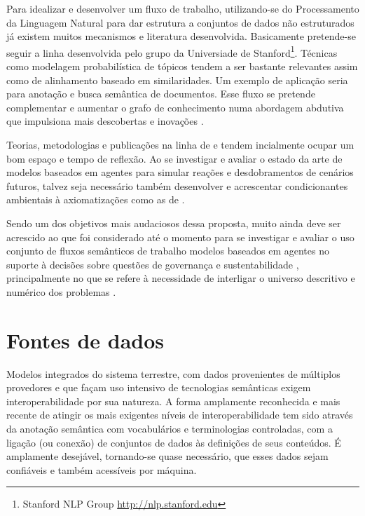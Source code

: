 \documentclass[
	11pt,				%
	openany,			%
	oneside,			%
	a4paper,			%
	english,			%
	french,				%
	spanish,			%
	brazil,				%
	]{abntex2}
\begin{document}
Para idealizar e desenvolver um fluxo de trabalho, utilizando-se do Processamento da Linguagem Natural para dar estrutura a conjuntos de dados não estruturados já existem muitos mecanismos e literatura desenvolvida. Basicamente pretende-se seguir a linha desenvolvida pelo grupo da Universiade de Stanford\footnote{Stanford NLP Group \url{http://nlp.stanford.edu}}. Técnicas como modelagem probabilística de tópicos \cite{blei_probabilistic_2012} tendem a ser bastante relevantes assim como de alinhamento baseado em similaridades. Um exemplo de aplicação seria para anotação e busca semântica de documentos. Esse fluxo se pretende complementar e aumentar o grafo de conhecimento numa abordagem abdutiva que impulsiona mais descobertas e inovações \cite{gil_data_2009}.

Teorias, metodologias e publicações na linha de  e  tendem incialmente ocupar um bom espaço e tempo de reflexão. Ao se investigar e avaliar o estado da arte de modelos baseados em agentes para simular reações e desdobramentos de cenários futuros, talvez seja necessário também desenvolver e acrescentar condicionantes ambientais à axiomatizações como as de .

Sendo um dos objetivos mais audaciosos dessa proposta, muito ainda deve ser acrescido ao que foi considerado até o momento para se investigar e avaliar o uso conjunto de fluxos semânticos de trabalho \cite{mattoso_addressing_2016} modelos baseados em agentes no suporte à decisões sobre questões de governança e sustentabilidade \cite{buckingham_shum_towards_2012}, principalmente no que se refere à necessidade de interligar o universo descritivo e numérico dos problemas \cite{patton_semnext:_2015}.


\chapter{Fontes de dados}

Modelos integrados do sistema terrestre, com dados provenientes de múltiplos provedores e que façam uso intensivo de tecnologias semânticas exigem interoperabilidade por sua natureza. A forma amplamente reconhecida e mais recente de atingir os mais exigentes níveis de interoperabilidade tem sido através da anotação semântica com vocabulários e terminologias controladas, com a ligação (ou conexão) de conjuntos de dados às definições de seus conteúdos. É amplamente desejável, tornando-se quase necessário, que esses dados sejam confiáveis e também acessíveis por máquina.
\end{document}
